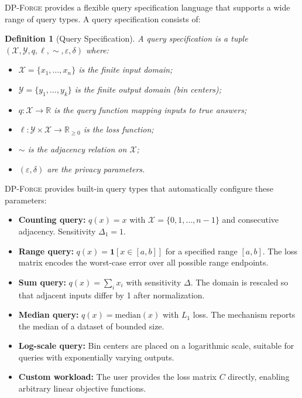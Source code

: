 \documentclass[11pt,a4paper]{article}
\newcommand{\dpforge}{\textsc{DP-Forge}}
\newcommand{\eps}{\varepsilon}
\newcommand{\R}{\mathbb{R}}
\newcommand{\cX}{\mathcal{X}}
\newcommand{\cY}{\mathcal{Y}}
\newtheorem{definition}{Definition}[section]
\begin{document}
\dpforge{} provides a flexible query specification language that supports a wide
range of query types.  A query specification consists of:

\begin{definition}[Query Specification]
\label{def:queryspec}
A \emph{query specification} is a tuple $(\cX, \cY, q, \ell, \sim, \eps, \delta)$ where:
\begin{itemize}[nosep]
  \item $\cX = \{x_1, \ldots, x_n\}$ is the finite input domain;
  \item $\cY = \{y_1, \ldots, y_k\}$ is the finite output domain (bin centers);
  \item $q: \cX \to \R$ is the query function mapping inputs to true answers;
  \item $\ell: \cY \times \cX \to \R_{\ge 0}$ is the loss function;
  \item $\sim$ is the adjacency relation on $\cX$;
  \item $(\eps, \delta)$ are the privacy parameters.
\end{itemize}
\end{definition}

\dpforge{} provides built-in query types that automatically configure these
parameters:

\begin{itemize}[nosep]
  \item \textbf{Counting query:}  $q(x) = x$ with $\cX = \{0, 1, \ldots, n-1\}$
        and consecutive adjacency.  Sensitivity $\Delta_1 = 1$.
  \item \textbf{Range query:}  $q(x) = \mathbf{1}[x \in [a,b]]$ for a specified
        range $[a,b]$.  The loss matrix encodes the worst-case error over all
        possible range endpoints.
  \item \textbf{Sum query:}  $q(x) = \sum_i x_i$ with sensitivity $\Delta$.
        The domain is rescaled so that adjacent inputs differ by 1 after
        normalization.
  \item \textbf{Median query:}  $q(x) = \text{median}(x)$ with $L_1$ loss.
        The mechanism reports the median of a dataset of bounded size.
  \item \textbf{Log-scale query:}  Bin centers are placed on a logarithmic
        scale, suitable for queries with exponentially varying outputs.
  \item \textbf{Custom workload:}  The user provides the loss matrix $C$
        directly, enabling arbitrary linear objective functions.
\end{itemize}
\end{document}
